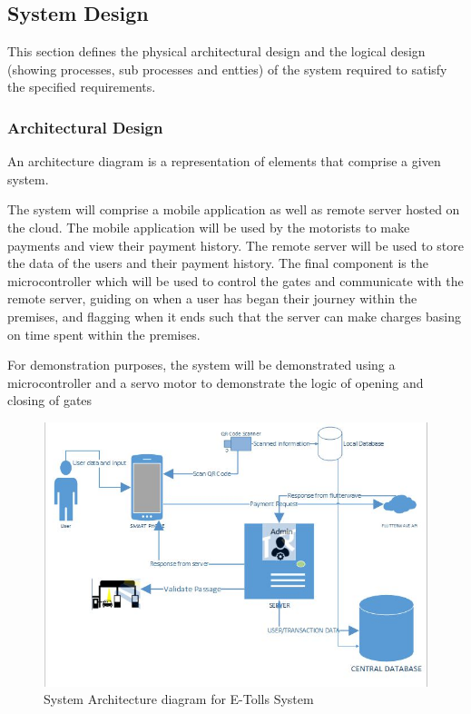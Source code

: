\subsection{System Design}
This section defines the physical architectural design and the logical design (showing processes, sub processes and entties)  of the system required to satisfy the specified requirements.

\subsubsection{Architectural Design}
An architecture diagram is a representation of elements that comprise a given system\cite{tilley2019systems}.

The system will comprise a mobile application as well as remote server hosted on the cloud. The mobile application will be used by the motorists to make payments and view their payment history. The remote server will be used to store the data of the users and their payment history. The final component is the microcontroller which will be used to control the gates and communicate with the remote server, guiding on when a user has began their journey within the premises, and flagging when it ends such that the server can make charges basing on time spent within the premises.

For demonstration purposes, the system will be demonstrated using a microcontroller and a servo motor to demonstrate the logic of opening and closing of gates


\begin{figure}[h]
    \begin{center}
        \includegraphics[scale = 0.8]{images/etolssys}
        \caption{System Architecture diagram for E-Tolls System}
    \end{center}
\end{figure}

